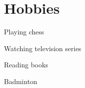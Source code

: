\documentclass[a4paper]{srika-resume} %
\begin{document}
\begin{minipage}[t]{0.64\textwidth}
\sectionspace %


\section{Hobbies} 
\begin{tightitemizespaced}
\item Playing chess
\item Watching television series
\item Reading books
\item Badminton
\end{tightitemizespaced}

\sectionspace %


\end{minipage} %








\end{document}
